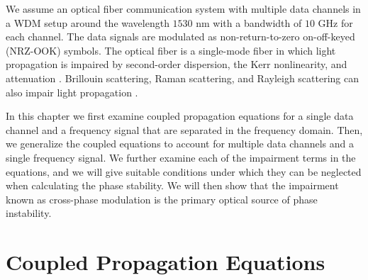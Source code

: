 We assume an optical fiber communication system with multiple data channels in a WDM setup around the wavelength $1530$ nm with a bandwidth of $10$ GHz for each channel. The data signals are modulated as non-return-to-zero on-off-keyed (NRZ-OOK) symbols. The optical fiber is a single-mode fiber in which light propagation is impaired by second-order dispersion, the Kerr nonlinearity, and attenuation \cite{agrawal2012fiber,Agrawal2013}. Brillouin scattering, Raman scattering, and Rayleigh scattering can also impair light propagation \cite{Boyd2003}.

In this chapter we first examine coupled propagation equations for a single data channel and a frequency signal that are separated in the frequency domain. Then, we generalize the coupled equations to account for multiple data channels and a single frequency signal. We further examine each of the impairment terms in the equations, and we will give suitable conditions under which they can be neglected when calculating the phase stability. We will then show that the impairment known as cross-phase modulation is the primary optical source of phase instability.

\section{Coupled Propagation Equations} \label{sec:cnlse}

